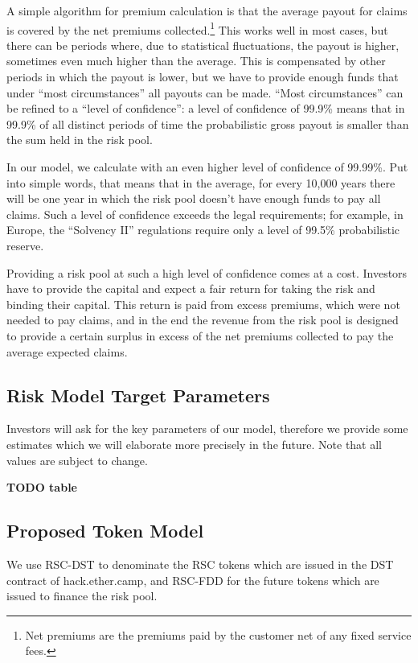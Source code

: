 \documentclass[12pt]{article}
\begin{document}
A simple algorithm for premium calculation is that the average payout for claims is covered by the net premiums collected.\footnote{Net premiums are the premiums paid by the customer net of any fixed service fees.} This works well in most cases, but there can be periods where, due to statistical fluctuations, the payout is higher, sometimes even much higher than the average. This is compensated by other periods in which the payout is lower, but we have to provide enough funds that under ``most circumstances'' all payouts can be made. “Most circumstances” can be refined to a ``level of confidence'': a level of confidence of 99.9\% means that in 99.9\% of all distinct periods of time the probabilistic gross payout is smaller than the sum held in the risk pool. 

In our model, we calculate with an even higher level of confidence of 99.99\%. Put into simple words, that means that in the average, for every 10,000 years there will be one year in which the risk pool doesn’t have enough funds to pay all claims. Such a level of confidence exceeds the legal requirements; for example, in Europe, the ``Solvency II'' regulations require only a level of 99.5\% probabilistic reserve. 

Providing a risk pool at such a high level of confidence comes at a cost. Investors have to provide the capital and expect a fair return for taking the risk and binding their capital. This return is paid from excess premiums, which were not needed to pay claims, and in the end the revenue from the risk pool is designed to provide a certain surplus in excess of the net premiums collected to pay the average expected claims. 

\subsection{Risk Model Target Parameters}

Investors will ask for the key parameters of our model, therefore we provide some estimates which we will elaborate more precisely in the future. Note that all values are subject to change.

\textbf{TODO table}

\subsection{Proposed Token Model}

We use RSC-DST to denominate the RSC tokens which are issued in the DST contract of hack.ether.camp, and RSC-FDD for the future tokens which are issued to finance the risk pool. 
\end{document}
